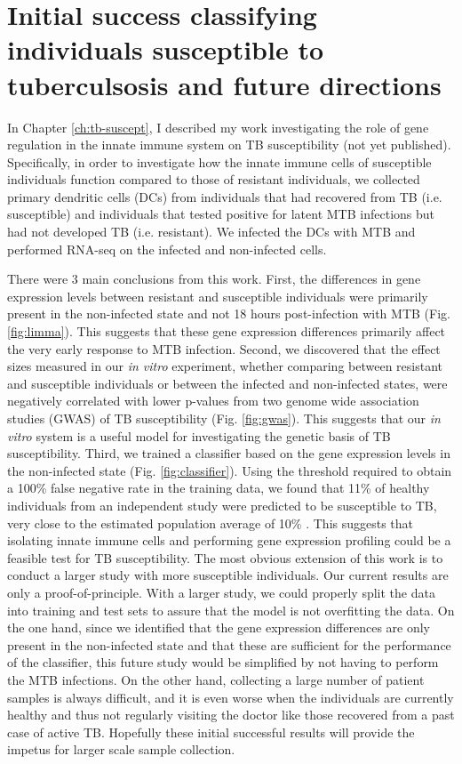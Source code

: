 \section{Initial success classifying individuals susceptible to tuberculsosis and future directions}

In Chapter \ref{ch:tb-suscept}, I described my work investigating the
role of gene regulation in the innate immune system on TB
susceptibility (not yet published). Specifically, in order to
investigate how the innate immune cells of susceptible individuals
function compared to those of resistant individuals, we collected
primary dendritic cells (DCs) from individuals that had recovered from
TB (i.e. susceptible) and individuals that tested positive for latent
MTB infections but had not developed TB (i.e. resistant). We infected
the DCs with MTB and performed RNA-seq on the infected and
non-infected cells.

There were 3 main conclusions from this work. First, the differences
in gene expression levels between resistant and susceptible
individuals were primarily present in the non-infected state and not 18
hours post-infection with MTB (Fig. \ref{fig:limma}). This suggests that these gene
expression differences primarily affect the very early response to MTB
infection. Second, we discovered that the effect sizes measured in our
\emph{in vitro} experiment, whether comparing between resistant and
susceptible individuals or between the infected and non-infected
states, were negatively correlated with lower p-values from two genome
wide association studies (GWAS) of TB susceptibility \citep{Thye2010} (Fig. \ref{fig:gwas}). This suggests
that our \emph{in vitro} system is a useful model for investigating
the genetic basis of TB susceptibility. Third, we trained a classifier
based on the gene expression levels in the non-infected state (Fig. \ref{fig:classifier}). Using
the threshold required to obtain a 100\% false negative rate in the
training data, we found that 11\% of healthy individuals from an
independent study \citep{Barreiro2012} were predicted to be susceptible to TB, very close
to the estimated population average of 10\% \citep{North2004, OGarra2013}. This suggests that
isolating innate immune cells and performing gene expression profiling
could be a feasible test for TB susceptibility.  The most obvious
extension of this work is to conduct a larger study with more
susceptible individuals. Our current results are only a
proof-of-principle. With a larger study, we could properly split the
data into training and test sets to assure that the model is not
overfitting the data. On the one hand, since we identified that the
gene expression differences are only present in the non-infected state
and that these are sufficient for the performance of the classifier,
this future study would be simplified by not having to perform the MTB
infections. On the other hand, collecting a large number of patient
samples is always difficult, and it is even worse when the individuals
are currently healthy and thus not regularly visiting the doctor like
those recovered from a past case of active TB. Hopefully these initial
successful results will provide the impetus for larger scale sample
collection.

